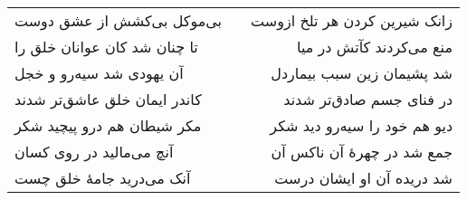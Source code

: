 \begin{center}
\begin{longtable}{l p{0.5cm} r}
بی‌موکل بی‌کشش از عشق دوست
&&
زانک شیرین کردن هر تلخ ازوست
\\
تا چنان شد کان عوانان خلق را
&&
منع می‌کردند کآتش در میا
\\
آن یهودی شد سیه‌رو و خجل
&&
شد پشیمان زین سبب بیماردل
\\
کاندر ایمان خلق عاشق‌تر شدند
&&
در فنای جسم صادق‌تر شدند
\\
مکر شیطان هم درو پیچید شکر
&&
دیو هم خود را سیه‌رو دید شکر
\\
آنچ می‌مالید در روی کسان
&&
جمع شد در چهرهٔ آن ناکس آن
\\
آنک می‌درید جامهٔ خلق چست
&&
شد دریده آن او ایشان درست
\\
\end{longtable}
\end{center}
